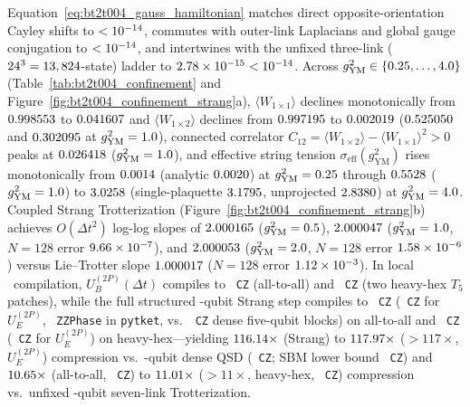 \documentclass[aps,prx,twocolumn,superscriptaddress,nofootinbib]{revtex4-2}
\begin{document}
Equation~\eqref{eq:bt2t004_gauss_hamiltonian} matches direct opposite-orientation Cayley shifts to $< 10^{-14}$, commutes with outer-link Laplacians and global gauge conjugation to $< 10^{-14}$, and intertwines with the unfixed three-link ($24^3 = 13,824$-state) ladder to $2.78 \times 10^{-15} < 10^{-14}$. Across $g_{\mathrm{YM}}^2 \in \{0.25, \dots, 4.0\}$ (Table~\ref{tab:bt2t004_confinement} and Figure~\ref{fig:bt2t004_confinement_strang}a), $\langle W_{1\times 1}\rangle$ declines monotonically from $0.998553$ to $0.041607$ and $\langle W_{1\times 2}\rangle$ declines from $0.997195$ to $0.002019$ ($0.525050$ and $0.302095$ at $g_{\mathrm{YM}}^2 = 1.0$), connected correlator $C_{12} = \langle W_{1\times 2}\rangle - \langle W_{1\times 1}\rangle^2 > 0$ peaks at $0.026418$ ($g_{\mathrm{YM}}^2 = 1.0$), and effective string tension $\sigma_{\mathrm{eff}}(g_{\mathrm{YM}}^2)$ rises monotonically from $0.0014$ (analytic $0.0020$) at $g_{\mathrm{YM}}^2 = 0.25$ through $0.5528$ ($g_{\mathrm{YM}}^2 = 1.0$) to $3.0258$ (single-plaquette $3.1795$, unprojected $2.8380$) at $g_{\mathrm{YM}}^2 = 4.0$. Coupled Strang Trotterization (Figure~\ref{fig:bt2t004_confinement_strang}b) achieves $O(\Delta t^2)$ log-log slopes of $2.000165$ ($g_{\mathrm{YM}}^2 = 0.5$), $2.000047$ ($g_{\mathrm{YM}}^2 = 1.0$, $N=128$ error $9.66 \times 10^{-7}$), and $2.000053$ ($g_{\mathrm{YM}}^2 = 2.0$, $N=128$ error $1.58 \times 10^{-6}$) versus Lie--Trotter slope $1.000017$ ($N=128$ error $1.12 \times 10^{-3}$). In local \rfsProxyTier\ compilation, $U_B^{(2P)}(\Delta t)$ compiles to \rfsBtCzUbAllToAll\ \texttt{CZ} (all-to-all) and \rfsBtCzUbHeavyHex\ \texttt{CZ} (two heavy-hex $T_5$ patches), while the full structured \rfsBtGaugeFixedQubits-qubit Strang step compiles to \rfsBtCzStrangAllToAll\ \texttt{CZ} (\rfsBtCzUeAllToAll\ \texttt{CZ} for $U_E^{(2P)}$, \rfsBtZzPhaseStrang\ \texttt{ZZPhase} in \texttt{pytket}, vs.\ \rfsBtCzDenseFiveQAllToAll\ \texttt{CZ} dense five-qubit blocks) on all-to-all and \rfsBtCzStrangHeavyHex\ \texttt{CZ} (\rfsBtCzUeHeavyHex\ \texttt{CZ} for $U_E^{(2P)}$) on heavy-hex---yielding $116.14\times$ (Strang) to $117.97\times$ ($> 117\times$, $U_E^{(2P)}$) compression vs.\ \rfsBtGaugeFixedQubits-qubit dense QSD (\rfsBtCzDenseTenQQsd\ \texttt{CZ}; SBM lower bound \rfsBtCzDenseTenQSbm\ \texttt{CZ}) and $10.65\times$ (all-to-all, \rfsBtCzUnfixedThirtyFiveAll\ \texttt{CZ}) to $11.01\times$ ($> 11\times$, heavy-hex, \rfsBtCzUnfixedThirtyFiveHex\ \texttt{CZ}) compression vs.\ unfixed \rfsBtUnfixedQubits-qubit seven-link Trotterization.
\end{document}
